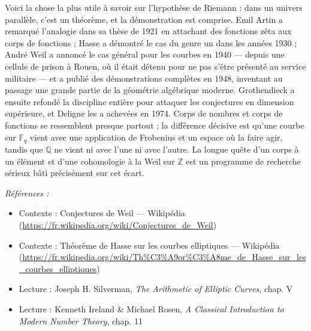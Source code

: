 \documentclass[11pt]{article}
\newenvironment{refs}{\par\small\noindent\emph{Références :}\begin{itemize}\setlength\itemsep{0pt}}{\end{itemize}\normalsize}
\begin{document}
\noindent Voici la chose la plus utile à savoir sur l'hypothèse de Riemann : dans
un univers parallèle, c'est un théorème, et la démonstration est comprise. Emil Artin a
remarqué l'analogie dans sa thèse de 1921 en attachant des fonctions zêta aux corps de
fonctions ; Hasse a démontré le cas du genre un dans les années 1930 ; André Weil a
annoncé le cas général pour les courbes en 1940 --- depuis une cellule de prison à Rouen, où
il était détenu pour ne pas s'être présenté au service militaire --- et a publié des
démonstrations complètes en 1948, inventant au passage une grande partie de la géométrie
algébrique moderne. Grothendieck a ensuite refondé la discipline entière pour attaquer les
conjectures en dimension supérieure, et Deligne les a achevées en 1974. Corps de nombres
et corps de fonctions se ressemblent presque partout ; la différence décisive est qu'une
courbe sur $ \mathbb{F}_q $ vient avec une application de Frobenius et un espace où la
faire agir, tandis que $\mathbb{Q}$ ne vient ni avec l'une ni avec l'autre. La longue quête d'un
\og{} corps à un élément \fg{} et d'une cohomologie à la Weil sur $\mathbb{Z}$ est un programme de recherche
sérieux bâti précisément sur cet écart.

\begin{refs}
\item Contexte : Conjectures de Weil --- Wikipédia (\url{https://fr.wikipedia.org/wiki/Conjectures_de_Weil})
\item Contexte : Théorème de Hasse sur les courbes elliptiques --- Wikipédia (\url{https://fr.wikipedia.org/wiki/Th%C3%A9or%C3%A8me_de_Hasse_sur_les_courbes_elliptiques})
\item Lecture : Joseph H. Silverman, \textit{The Arithmetic of Elliptic Curves}, chap. V
\item Lecture : Kenneth Ireland \& Michael Rosen, \textit{A Classical Introduction to Modern Number Theory}, chap. 11
\end{refs}

\bigskip
\end{document}
